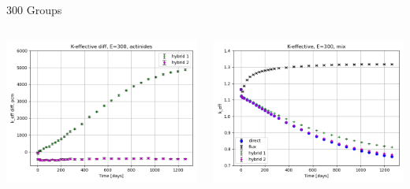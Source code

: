 \documentclass[
	11pt, %
	aspectratio=169, %
]{beamer}
\begin{document}
\begin{frame}{300 Groups}
\begin{columns}[c]
\begin{column}{0.32\textwidth}
			\includegraphics[width=\textwidth]{../figures/keff/keff_actinides_300_diff.png}
		\end{column}
		\begin{column}{0.32\textwidth} %
			\includegraphics[width=\textwidth]{../figures/keff/keff_mix_300.png}


\end{column}
\end{columns}
\end{frame}
\end{document}
